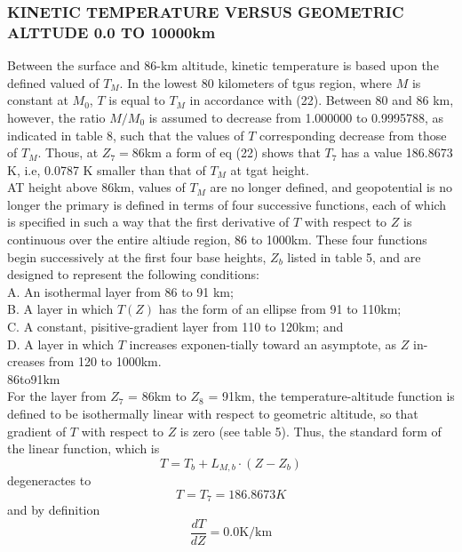 \documentclass{article}
\begin{document}
\subsubsection{KINETIC TEMPERATURE VERSUS GEOMETRIC ALTTUDE 0.0 TO 10000km}
Between the surface and 86-km altitude, kinetic temperature is based upon the defined valued of $T_M$. In the lowest 80 kilometers of tgus region, where $M$ is constant at $M_0$, $T$ is equal to $T_M$ in accordance with (22). Between 80 and 86 km, however, the ratio $M/M_0$ is assumed to decrease from 1.000000 to 0.9995788, as indicated in table 8, such that the values of $T$ corresponding decrease from those of $T_M$. Thous, at $Z_7 = 86$km a form of eq (22) shows that $T_7$ has a value 186.8673 K, i.e, 0.0787 K smaller than that of $T_M$ at tgat height.\\

AT height above 86km, values of $T_M$ are no longer defined, and geopotential is no longer the primary is defined in terms of four successive functions, each of which is specified in such a way that the first derivative of $T$ with respect to $Z$ is continuous over the entire altiude region, 86 to 1000km. These four functions begin successively at the first four base heights, $Z_b$ listed in table 5, and are designed to represent the following conditions:\\
\indent A. An isothermal layer from 86 to 91 km;\\
\indent B. A layer in which $T(Z)$ has the form of an ellipse from 91 to 110km;\\
\indent C. A constant, pisitive-gradient layer from 110 to 120km; and\\
\indent D. A layer in which $T$ increases exponen-tially toward an asymptote, as $Z$ in-creases from 120 to 1000km.\\
86to91km\\

For the layer from $Z_7$ = 86km to $Z_8$ = 91km, the temperature-altitude function is defined to be isothermally linear with respect to geometric altitude, so that gradient of $T$ with respect to $Z$ is zero (see table 5). Thus, the standard form of the linear function, which is
\begin{equation}
  T = T_b + L_{M,b}\cdot (Z - Z_b) 
  \tag{24}
\end{equation}
degeneractes to
\begin{equation}
  T= T_7 = 186.8673 K
  \tag{25}
\end{equation}
and by definition
\begin{equation}
  \frac{dT}{dZ} = 0.0 \text{K/km}
  \tag{26}
\end{equation}
\end{document}
